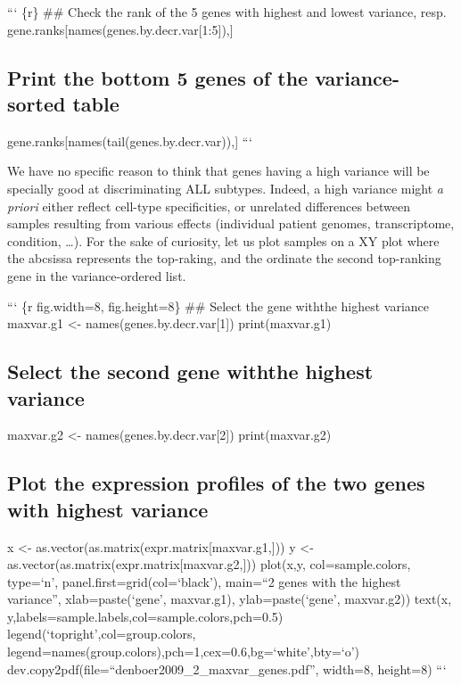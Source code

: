 ``` \{r\} \#\# Check the rank of the 5 genes with highest and lowest
variance, resp. gene.ranks{[}names(genes.by.decr.var{[}1:5{]}),{]}

\subsection{Print the bottom 5 genes of the variance-sorted
table}\label{print-the-bottom-5-genes-of-the-variance-sorted-table}

gene.ranks{[}names(tail(genes.by.decr.var)),{]} ```

We have no specific reason to think that genes having a high variance
will be specially good at discriminating ALL subtypes. Indeed, a high
variance might \emph{a priori} either reflect cell-type specificities,
or unrelated differences between samples resulting from various effects
(individual patient genomes, transcriptome, condition, \ldots{}). For
the sake of curiosity, let us plot samples on a XY plot where the
abcsissa represents the top-raking, and the ordinate the second
top-ranking gene in the variance-ordered list.

``` \{r fig.width=8, fig.height=8\} \#\# Select the gene withthe highest
variance maxvar.g1 \textless{}- names(genes.by.decr.var{[}1{]})
print(maxvar.g1)

\subsection{Select the second gene withthe highest
variance}\label{select-the-second-gene-withthe-highest-variance}

maxvar.g2 \textless{}- names(genes.by.decr.var{[}2{]}) print(maxvar.g2)

\subsection{Plot the expression profiles of the two genes with highest
variance}\label{plot-the-expression-profiles-of-the-two-genes-with-highest-variance}

x \textless{}- as.vector(as.matrix(expr.matrix{[}maxvar.g1,{]})) y
\textless{}- as.vector(as.matrix(expr.matrix{[}maxvar.g2,{]})) plot(x,y,
col=sample.colors, type=`n', panel.first=grid(col=`black'), main=``2
genes with the highest variance'', xlab=paste(`gene', maxvar.g1),
ylab=paste(`gene', maxvar.g2)) text(x,
y,labels=sample.labels,col=sample.colors,pch=0.5)
legend(`topright',col=group.colors,
legend=names(group.colors),pch=1,cex=0.6,bg=`white',bty=`o')
dev.copy2pdf(file=``denboer2009\_2\_maxvar\_genes.pdf'', width=8,
height=8) ```

